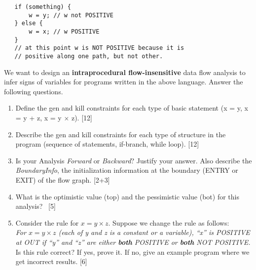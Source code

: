 \documentclass[12pt]{article}
\begin{document}
\begin{enumerate}
\begin{verbatim}
   if (something) {
       w = y; // w not POSITIVE
   } else {
       w = x; // w POSITIVE
   }
   // at this point w is NOT POSITIVE because it is 
   // positive along one path, but not other.

\end{verbatim}

We want to design an {\bf intraprocedural flow-insensitive} data flow
analysis  to infer signs of variables for programs
written in the above language. Answer the following questions.
\begin{enumerate}
\item Define the gen and kill constraints for each type of
  basic statement (x = y, x = y + z, x = y $\times$
  z). \hfill[12]
  
\item Describe the gen and kill constraints for each type of
  structure in the program (sequence of statements,
  if-branch, while loop). \hfill[12]
  
\item Is your Analysis {\em Forward} or {\em Backward}?
  Justify your answer. Also describe the {\em BoundaryInfo},
  the initialization information at the boundary (ENTRY or EXIT)
  of the flow  graph. \hfill[2+3] 
  
\item What is the optimistic value (top) and the pessimistic
  value (bot) for this analysis?\linebreak\mbox{ }  \hfill[5]
  
\item Consider the rule for $x = y \times z$. Suppose we
  change the rule as follows:\\
{\em
  For $x = y \times z$ (each of y and z is a
  constant or a variable), ``x'' is POSITIVE at OUT if ``y''
  and ``z'' are either {\bf both} POSITIVE or {\bf both} NOT
  POSITIVE.
}\\
Is this rule correct? If yes, prove it. If no, give an
 example program where we get incorrect results. \hfill[6]
\end{enumerate}
\clearpage
\mbox{}
\clearpage
\mbox{}
\clearpage
\mbox{}
\clearpage
\end{enumerate}
\end{document}
